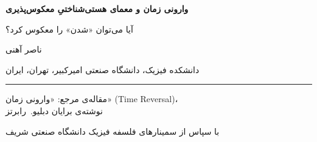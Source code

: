 \documentclass[12pt,a4paper]{article}
\begin{document}
\vspace*{4cm}
\begin{center}
{\LARGE\bfseries وارونی زمان و معمای هستی‌شناختیِ معکوس‌پذیری}

\vspace{0.4cm}
{\large آیا می‌توان «شدن» را معکوس کرد؟}

\vspace{2cm}
{\large ناصر آهنی}

\vspace{0.3cm}
دانشکده فیزیک، دانشگاه صنعتی امیرکبیر، تهران، ایران

\vspace{0.2cm}
{\small {}}

\vspace{0.2cm}
{\small {}}

\vspace{2.5cm}
\rule{6cm}{0.4pt}

\vspace{0.6cm}
\begin{minipage}{0.8\textwidth}
\centering
مقاله‌ی مرجع: «وارونی زمان» (Time Reversal)،\\ نوشته‌ی برایان دبلیو.\ رابرتز

\vspace{0.8cm}
{\small با سپاس از سمینارهای فلسفه فیزیک دانشگاه صنعتی شریف}
\end{minipage}
\end{center}
\end{document}
